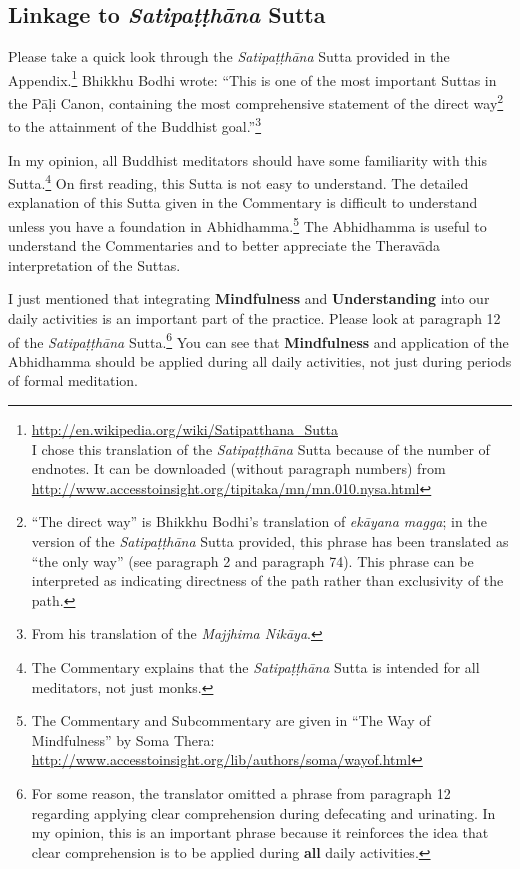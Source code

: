 \subsection*{Linkage to \textit{Satipaṭṭhāna} Sutta}

Please take a quick look through the \textit{Satipaṭṭhāna} Sutta provided in the Appendix.\footnote{\url{http://en.wikipedia.org/wiki/Satipatthana_Sutta} \\ I chose this translation of the \textit{Satipaṭṭhāna} Sutta because of the number of endnotes. It can be downloaded (without paragraph numbers) from \url{http://www.accesstoinsight.org/tipitaka/mn/mn.010.nysa.html}} Bhikkhu Bodhi wrote: “This is one of the most important Suttas in the Pāḷi Canon, containing the most comprehensive statement of the direct way\footnote{“The direct way” is Bhikkhu Bodhi's translation of \textit{ekāyana magga}; in the version of the \textit{Satipaṭṭhāna} Sutta provided, this phrase has been translated as “the only way” (see paragraph 2 and paragraph 74). This phrase can be interpreted as indicating directness of the path rather than exclusivity of the path.} to the attainment of the Buddhist goal.”\footnote{From his translation of the \textit{Majjhima Nikāya}.} 

In my opinion, all Buddhist meditators should have some familiarity with this Sutta.\footnote{The Commentary explains that the \textit{Satipaṭṭhāna} Sutta is intended for all meditators, not just monks.} On first reading, this Sutta is not easy to understand. The detailed explanation of this Sutta given in the Commentary is difficult to understand unless you have a foundation in Abhidhamma.\footnote{The Commentary and Subcommentary are given in “The Way of Mindfulness” by Soma Thera: \url{http://www.accesstoinsight.org/lib/authors/soma/wayof.html}} The Abhidhamma is useful to understand the Commentaries and to better appreciate the Theravāda interpretation of the Suttas.

I just mentioned that integrating \textbf{Mindfulness} and \textbf{Understanding} into our daily activities is an important part of the practice. Please look at paragraph 12 of the \textit{Satipaṭṭhāna} Sutta.\footnote{For some reason, the translator omitted a phrase from paragraph 12 regarding applying clear comprehension during defecating and urinating. In my opinion, this is an important phrase because it reinforces the idea that clear comprehension is to be applied during \textbf{all} daily activities.} You can see that \textbf{Mindfulness} and application of the Abhidhamma should be applied during all daily activities, not just during periods of formal meditation.

